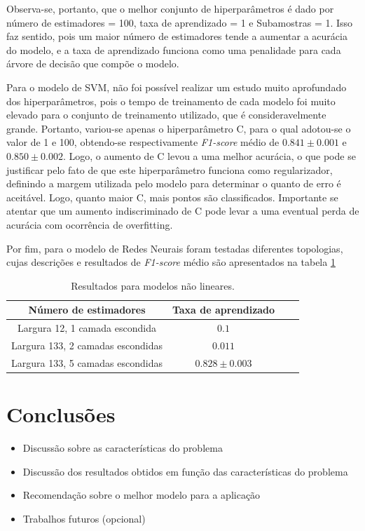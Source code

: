 \documentclass{homework}
\begin{document}
Observa-se, portanto, que o melhor conjunto de hiperparâmetros é dado por número de estimadores = 100, taxa de
aprendizado = 1 e Subamostras = 1. Isso faz sentido, pois um maior número de estimadores tende a aumentar a acurácia do
modelo, e a taxa de aprendizado funciona como uma penalidade para cada árvore de decisão que compõe o modelo.

Para o modelo de SVM, não foi possível realizar um estudo muito aprofundado dos hiperparâmetros, pois o tempo de
treinamento de cada modelo foi muito elevado para o conjunto de treinamento utilizado, que é consideravelmente grande.
Portanto, variou-se apenas o hiperparâmetro C, para o qual adotou-se o valor de 1 e 100, obtendo-se respectivamente
\textit{F1-score} médio de $0.841 \pm 0.001$ e $0.850 \pm 0.002$. Logo, o aumento de C levou a uma melhor acurácia, o
que pode se justificar pelo fato de que este hiperparâmetro funciona como regularizador, definindo a margem utilizada
pelo modelo para determinar o quanto de erro é aceitável. Logo, quanto maior C, mais pontos são classificados.
Importante se atentar que um aumento indiscriminado de C pode levar a uma eventual perda de acurácia com ocorrência de
overfitting.

Por fim, para o modelo de Redes Neurais foram testadas diferentes topologias, cujas descrições e resultados de
\textit{F1-score} médio são apresentados na tabela \ref{nn_topology}

\begin{table}[h!]
    \centering
    \begin{tabular}{|c|c|c|c|}
        \hline
        \textbf{Número de estimadores} & \textbf{Taxa de aprendizado} \\
        \hline
        Largura 12, 1 camada escondida & $0.1$ \\
        \hline
        Largura 133, 2 camadas escondidas & $0.011$ \\
        \hline
        Largura 133, 5 camadas escondidas & $0.828 \pm 0.003$ \\
        \hline
    \end{tabular}
    \caption{Resultados para modelos não lineares.}
    \label{nn_topology}
\end{table}

\section{Conclusões}

\begin{itemize}
    \color{red}
        \item Discussão sobre as características do problema
        \item Discussão dos resultados obtidos em função das características do problema
        \item Recomendação sobre o melhor modelo para a aplicação
        \item Trabalhos futuros (opcional)
\end{itemize}
\end{document}
